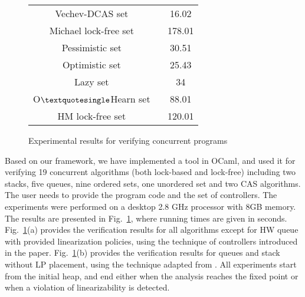 \begin{figure}[]
\begin{tabular}{|c | c | }
\textsf{Vechev-DCAS set  ~\cite{Vechev:list}}   & \textsf{16.02}  \\

\textsf{Michael lock-free set ~\cite{Michael:list}}  & \textsf{178.01}  \\

\textsf{Pessimistic set  ~\cite{ArtOfMpP}}&\textsf{30.51} \\

\textsf{Optimistic set ~\cite{ArtOfMpP}}& \textsf{25.43} \\

\textsf{Lazy set ~\cite{Lazyset}  }  & \textsf {34} \\

\textsf {O$\textquotesingle $Hearn set  ~\cite{OHearnlist}}     & \textsf{88.01} \\

\textsf{HM lock-free set  ~\cite{ArtOfMpP} } & \textsf{120.01} \\
\hline
\end{tabular}

\caption{Experimental results for verifying concurrent programs}
\label{Experiments:fig}
\end{figure}
Based on our framework, we have implemented a tool in OCaml, and used
it for
verifying 19 concurrent algorithms (both lock-based and lock-free)
including two stacks, 
five queues, nine ordered sets, one unordered set and two CAS algorithms. 
%
The user needs to provide the program code and the 
set of controllers.
%
The experiments were performed on a desktop 2.8 GHz processor with 8GB memory.
The results are presented in Fig.~\ref{Experiments:fig},
where running times are given in seconds. 
Fig.~\ref{Experiments:fig}(a) provides the verification
results for all algorithms except for HW queue with provided 
linearization policies, using the technique of controllers introduced in 
the paper. Fig.~\ref{Experiments:fig}(b) provides the verification
results for queues and stack without LP placement, using the technique 
adapted from \cite{BEEH:icalp15,HSV:concur13}.
%
All experiments start from the initial heap,  
and end either when the analysis 
reaches the fixed point or when a violation of linearizability is detected. 

%




